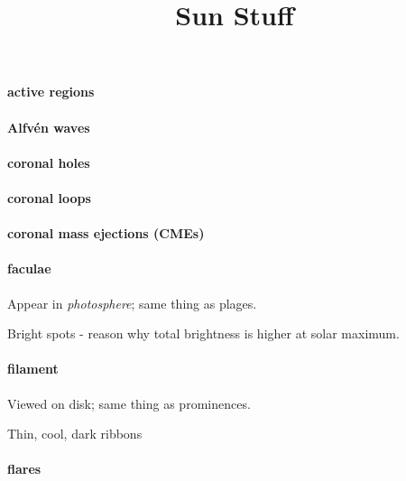 \documentclass[12pt]{article}
\title{\vspace{-0.5in}Sun Stuff}
\author{}
\date{}
\begin{document}
\maketitle

\vspace{-1in}

\paragraph{active regions}

\paragraph{Alfv\'en waves}

\paragraph{coronal holes}

\paragraph{coronal loops}

\paragraph{coronal mass ejections (CMEs)}

\paragraph{faculae}
    \begin{itemize*}
        \item Appear in \emph{photosphere}; same thing as plages.
        \item Bright spots - reason why total brightness is higher at
        solar maximum.
    \end{itemize*}

\paragraph{filament}
    \begin{itemize*}
        \item Viewed on disk; same thing as prominences.
        \item Thin, cool, dark ribbons
    \end{itemize*}

\paragraph{flares}
\end{document}

